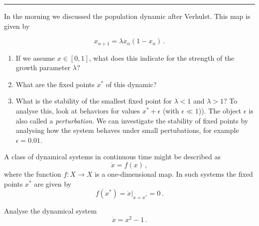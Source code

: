 

\usepackage{pstricks,pst-node,pst-tree}




  \sheet[%
  number=5,
  topic={Dynamical Systems},
    ]

\vspace{-1cm}
\noindent\rule{12cm}{0.4pt}

  \exercise[%
  topic = Population Dynamic for Discrete Time Steps
  ]


In the morning we discussed the population dynamic after Verhulst. This map is given by

  \begin{equation}
      x_{n+1} = \lambda x_n(1-x_n)\,.
  \end{equation}


  \begin{enumerate}
      \item If we assume $x\in [0,1]$, what does this indicate for the strength of the growth parameter $\lambda$?
      \item What are the fixed points $x^*$ of this dynamic?
      \item What is the stability of the smallest fixed point for $\lambda<1$ and $\lambda>1$? To analyse this, look at behaviors for values $x^*+\epsilon$ (with $\epsilon\ll1$)). The object $\epsilon$ is also called a \emph{perturbation}. We can investigate the stability of fixed points by analysing how the system behaves under small pertubations, for example  $\epsilon=0.01$.
  \end{enumerate}
    
  \exercise[%
  topic = Dynamic System in Continuous Time 
  ]


A class of dynamical systems in continuous time might be described as 
  \begin{equation}
      \dot x = f(x)\,,
  \end{equation}
 where the function $f:X\rightarrow X$ is a one-dimensional map. In such systems the fixed points $x^*$  are given by 
    \begin{equation}
      f(x^*) = \dot x|_{x=x^*} = 0\,.
  \end{equation}
  
  \subexercise

Analyse the dynamical system
  \begin{equation}
      \dot x = x^2 -1\,.
  \end{equation}
  
